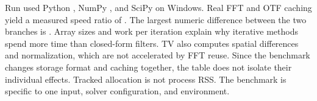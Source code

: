 Run \texttt{\RunID} used Python \PythonVersion, NumPy \NumPyVersion, and SciPy \SciPyVersion{} on Windows. Real FFT and OTF caching yield a measured speed ratio of \BenchmarkSpeedRange{}. The largest numeric difference between the two branches is \BenchmarkMaxError{}. Array sizes and work per iteration explain why iterative methods spend more time than closed-form filters. TV also computes spatial differences and normalization, which are not accelerated by FFT reuse. Since the benchmark changes storage format and caching together, the table does not isolate their individual effects. Tracked allocation is not process RSS. The benchmark is specific to one input, solver configuration, and environment.
